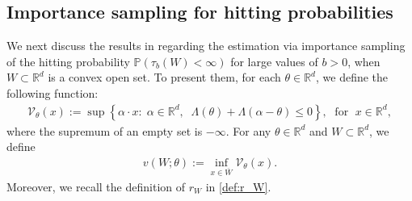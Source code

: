 \documentclass[aap,preprint]{imsart}
\newcommand{\Pro}{{\mathbb{P}}}
\newcommand{\bR}{{\mathbb{R}}}
\theoremstyle{plain}
\theoremstyle{definition}
\begin{document}





\subsection{Importance sampling for hitting probabilities}
We next discuss the results in \citet{collamore2002} regarding the estimation via importance sampling of the hitting probability $\Pro(\tau_b(W) < \infty)$ for large values of $b > 0$,  when $W \subset \mathbb{R}^d$ is a convex  open set.
To present them, for each $\theta \in \bR^d$, we define the following function:
\begin{align} \label{def:rate_theta}
    \mathcal{V}_\theta(x)  :=  \sup\left\{\alpha \cdot x: \;\alpha \in \bR^d, \;\;\Lambda(\theta) + \Lambda(\alpha-\theta) \leq 0  \right\},\; \text{ for } \;x \in \bR^d,
\end{align}
where the supremum of an empty set is $-\infty$. For any $\theta \in \mathbb{R}^d$ and $W \subset \mathbb{R}^d$, we define
\begin{align}\label{def:V_W_theta}
    v(W;\theta) := \inf_{x \in \overline{W}} \mathcal{V}_\theta(x). 
\end{align}
Moreover,  we recall the definition of $r_W$ in \eqref{def:r_W}.
\end{document}
